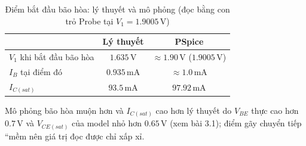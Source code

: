 \begin{table}[H]
\centering
\begin{tabular}{l|c|c}
\toprule
 & Lý thuyết & PSpice \\
\midrule
$V_1$ khi bắt đầu bão hòa & $1.635\,\text{V}$ & $\approx 1.90\,\text{V}$ ($1.9005\,\text{V}$) \\
$I_B$ tại điểm đó & $0.935\,\text{mA}$ & $\approx 1.0\,\text{mA}$ \\
$I_{C(sat)}$ & $93.5\,\text{mA}$ & $97.92\,\text{mA}$ \\
\bottomrule
\end{tabular}
\caption{Điểm bắt đầu bão hòa: lý thuyết và mô phỏng (đọc bằng con trỏ Probe tại $V_1 = 1.9005\,\text{V}$)}
\end{table}

Mô phỏng bão hòa muộn hơn và $I_{C(sat)}$ cao hơn lý thuyết do $V_{BE}$ thực cao hơn $0.7\,\text{V}$ và $V_{CE(sat)}$ của model nhỏ hơn $0.65\,\text{V}$ (xem bài 3.1); điểm gãy chuyển tiếp ``mềm nên giá trị đọc được chỉ xấp xỉ.
